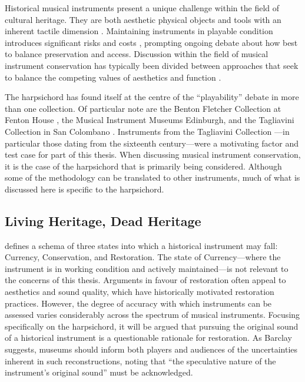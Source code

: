 Historical musical instruments present a unique challenge within the field of
cultural heritage. They are both aesthetic physical objects and tools with an
inherent tactile dimension \cite{charalampos_role_2018}. Maintaining instruments
in playable condition introduces significant risks and costs
\cite{lamb_play_2007}, prompting ongoing debate about how best to balance
preservation and access. Discussion within the field of musical instrument
conservation has typically been divided between approaches that seek to balance
the competing values of aesthetics and function \cite{barclay_care_1997,
	barclay_preservation_2005}.

The harpsichord has found itself at the centre of the ``playability'' debate in
more than one collection. Of particular note are the Benton Fletcher Collection
at Fenton House \cite{barclay_preservation_2005, mcalpine_sampling_2014}, the
Musical Instrument Museums Edinburgh, and the Tagliavini Collection in San
Colombano \cite{wraight_report_2022}. Instruments from the Tagliavini Collection
\cite{meer_collezione_2007}---in particular those dating from the sixteenth
century---were a motivating factor and test case for part of this thesis. When
discussing musical instrument conservation, it is the case of the harpsichord
that is primarily being considered. Although some of the methodology can be
translated to other instruments, much of what is discussed here is specific to
the harpsichord.


\subsection{Living Heritage, Dead Heritage}

\textcite[p.\ 19]{barclay_preservation_2005} defines a schema of three states
into which a historical instrument may fall: Currency, Conservation, and
Restoration. The state of Currency---where the instrument is in working condition
and actively maintained---is not relevant to the concerns of this thesis.
Arguments in favour of restoration often appeal to aesthetics and sound quality,
which have historically motivated restoration practices. However, the degree of
accuracy with which instruments can be assessed varies considerably across the
spectrum of musical instruments. Focusing specifically on the harpsichord, it
will be argued that pursuing the original sound of a historical instrument is a
questionable rationale for restoration. As Barclay suggests, museums should
inform both players and audiences of the uncertainties inherent in such
reconstructions, noting that ``the speculative nature of the instrument’s
original sound'' \cite[p.\ 83]{barclay_care_1997} must be acknowledged.


